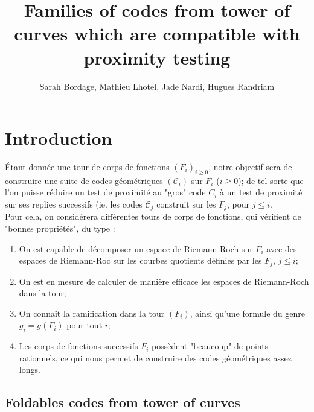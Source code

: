 \documentclass[10pt]{article}
\title{Families of codes from tower of curves which are compatible with proximity testing}
\author{Sarah Bordage, Mathieu Lhotel, Jade Nardi, Hugues Randriam}
\begin{document}
\maketitle

\section{Introduction}

Étant donnée une tour de corps de fonctions $(F_i)_{i \geq 0}$, notre objectif sera de construire une suite de codes géométriques $(\mathcal{C}_i)$ sur $F_i$ ($i \geq 0$); de tel sorte que l'on puisse réduire un test de proximité au "gros" code $C_i$ à un test de proximité sur ses replies successifs (ie. les codes $\mathcal{C}_j$ construit sur les $F_j$, pour $j \leq i$. \\
Pour cela, on considérera différentes tours de corps de fonctions, qui vérifient de "bonnes propriétés", du type :
\begin{enumerate}
\item On est capable de décomposer un espace de Riemann-Roch sur $F_i$ avec des espaces de Riemann-Roc sur les courbes quotients définies par les $F_j$, $j \leq i$;
\item On est en mesure de calculer de manière efficace les espaces de Riemann-Roch dans la tour;
\item On connaît la ramification dans la tour $(F_i)$, ainsi qu'une formule du genre $g_i = g(F_i)$ pour tout $i$;
\item Les corps de fonctions successifs $F_i$ possèdent "beaucoup" de points rationnels, ce qui nous permet de construire des codes géométriques assez longs.
\end{enumerate}

\subsection{Foldables codes from tower of curves}

\end{document}
